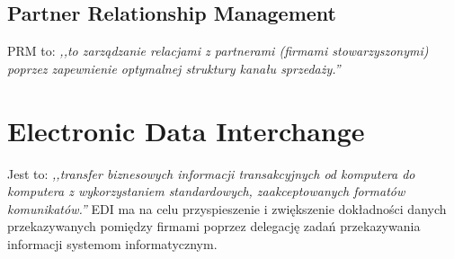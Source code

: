 \documentclass{report}
\begin{document}
\subsection{Partner Relationship Management}
PRM to: \emph{,,to zarządzanie relacjami z partnerami (firmami stowarzyszonymi) poprzez zapewnienie optymalnej struktury kanału sprzedaży.''}\cite{wiki:prm}
\section{Electronic Data Interchange}
Jest to: \emph{,,transfer biznesowych informacji transakcyjnych od komputera do komputera z wykorzystaniem standardowych, zaakceptowanych formatów komunikatów.''}\cite{wiki:edi} EDI ma na celu przyspieszenie i zwiększenie dokładności danych przekazywanych pomiędzy firmami poprzez delegację zadań przekazywania informacji systemom informatycznym.
{}

\end{document}
